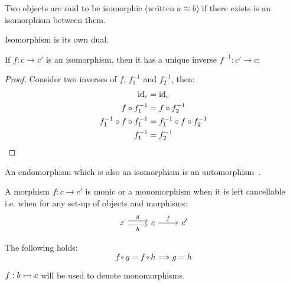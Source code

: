\begin{remark}
  Two objects are said to be isomorphic (written $a\cong b$) if there exists is
  an isomorphism between them.
\end{remark}

\begin{remark}
  Isomorphism is its own dual.
\end{remark}

\begin{theorem}
  If $f: c\to c'$ is an isomorphism, then it has a unique inverse $f^{-1}:c'\to
  c$:

  \begin{proof}
    Consider two inverses of $f$, $f^{-1}_1$ and $f^{-1}_2$, then:
    \[
      \begin{aligned}
        \mathrm{id}_c &= \mathrm{id}_c\\
        f\circ f^{-1}_1 &= f\circ f^{-1}_2\\
        f^{-1}_1 \circ f \circ f^{-1}_1 &= f^{-1}_1 \circ f \circ f^{-1}_2\\
        f^{-1}_1 &= f^{-1}_2
      \end{aligned}
    \]
  \end{proof}
\end{theorem}

\begin{definition}
  An endomorphism which is also an isomorphism is an
  automorphism~\parencite{riehl:category_theory_in_context}.
\end{definition}

\begin{definition}
  A morphism $f:c\to c'$ is monic or a monomorphism when it is left
  cancellable~\parencite{lane:working_mathematician} i.e. when for any
  set-up of objects and morphisms:
  \[\begin{tikzcd}[ampersand replacement=\&]
    x \& c \& {c'}
    \arrow["f", from=1-2, to=1-3]
    \arrow["g", shift left=1, from=1-1, to=1-2]
    \arrow["h"', shift right=1, from=1-1, to=1-2]
  \end{tikzcd}\]

  The following holds:
  \[f \circ g = f \circ h \implies g = h\]
\end{definition}

\begin{remark}
  $f:b\rightarrowtail c$ will be used to denote monomorphisms.
\end{remark}

